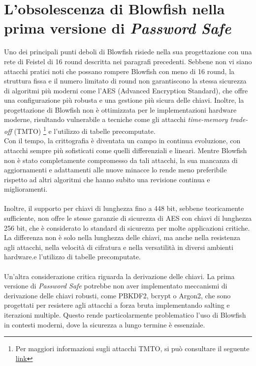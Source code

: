 \documentclass[a4paper,12pt]{report}
\begin{document}
		\section*{L'obsolescenza di Blowfish nella prima versione di
		\textit{Password Safe}}
			Uno dei principali punti deboli di Blowfish risiede nella sua
			progettazione con una rete di Feistel di 16 round descritta nei
			paragrafi precedenti. Sebbene non vi siano attacchi pratici noti che
			possano rompere Blowfish con meno di 16 round, la struttura fissa e il
			numero limitato di round non garantiscono la stessa sicurezza di
			algoritmi più moderni come l'AES (Advanced Encryption Standard), che
			offre una configurazione più robusta e una gestione più sicura delle
			chiavi. Inoltre, la progettazione di Blowfish non è ottimizzata per le
			implementazioni hardware moderne, risultando vulnerabile a tecniche come
			gli attacchi \textit{time-memory trade-off} (TMTO) \footnote{Per
			maggiori informazioni sugli attacchi TMTO, si può consultare il seguente
			\href{https://en.wikipedia.org/wiki/Time/Memory/Data_Tradeoff_attack}{link}} e
			l'utilizzo di tabelle precomputate.\\ 
			Con il tempo, la crittografia è diventata un campo in continua 
			evoluzione, con attacchi sempre più sofisticati come quelli
			differenziali e lineari. Mentre Blowfish non è stato completamente
			compromesso da tali attacchi, la sua mancanza di aggiornamenti e
			adattamenti alle nuove minacce lo rende meno preferibile rispetto ad
			altri algoritmi che hanno subito una revisione continua e miglioramenti.\\\\
			Inoltre, il supporto per chiavi di lunghezza fino a 448 bit, sebbene
			teoricamente sufficiente, non offre le stesse garanzie di sicurezza di
			AES con chiavi di lunghezza 256 bit, che è considerato lo standard di
			sicurezza per molte applicazioni critiche. La differenza non è solo
			nella lunghezza delle chiavi, ma anche nella resistenza agli attacchi,
			nella velocità di cifratura e nella versatilità in diversi ambienti
			hardware.e l'utilizzo di tabelle precomputate.\\\\
			Un'altra considerazione critica riguarda la derivazione delle chiavi. La prima
			versione di \textit{Password Safe} potrebbe non aver implementato meccanismi di
			derivazione delle chiavi robusti, come PBKDF2, bcrypt o Argon2, che sono
			progettati per resistere agli attacchi a forza bruta implementando salting e
			iterazioni multiple. Questo rende particolarmente problematico l'uso di Blowfish
			in contesti moderni, dove la sicurezza a lungo termine è essenziale.\\
\end{document}

